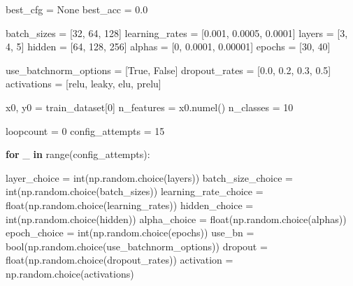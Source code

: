 \documentclass[
  letterpaper,
  DIV=11,
  numbers=noendperiod]{scrartcl}
\newenvironment{Shaded}{\begin{snugshade}}{\end{snugshade}}
\newcommand{\BuiltInTok}[1]{\textcolor[rgb]{0.00,0.23,0.31}{#1}}
\newcommand{\ControlFlowTok}[1]{\textcolor[rgb]{0.00,0.23,0.31}{\textbf{#1}}}
\newcommand{\DecValTok}[1]{\textcolor[rgb]{0.68,0.00,0.00}{#1}}
\newcommand{\FloatTok}[1]{\textcolor[rgb]{0.68,0.00,0.00}{#1}}
\newcommand{\KeywordTok}[1]{\textcolor[rgb]{0.00,0.23,0.31}{\textbf{#1}}}
\newcommand{\NormalTok}[1]{\textcolor[rgb]{0.00,0.23,0.31}{#1}}
\newcommand{\OperatorTok}[1]{\textcolor[rgb]{0.37,0.37,0.37}{#1}}
\newcommand{\StringTok}[1]{\textcolor[rgb]{0.13,0.47,0.30}{#1}}
\newcommand{\VariableTok}[1]{\textcolor[rgb]{0.07,0.07,0.07}{#1}}
\begin{document}
\begin{Shaded}
\begin{Highlighting}[]
\NormalTok{    best\_cfg }\OperatorTok{=} \VariableTok{None}
\NormalTok{    best\_acc }\OperatorTok{=} \FloatTok{0.0}

\NormalTok{    batch\_sizes }\OperatorTok{=}\NormalTok{ [}\DecValTok{32}\NormalTok{, }\DecValTok{64}\NormalTok{, }\DecValTok{128}\NormalTok{]}
\NormalTok{    learning\_rates }\OperatorTok{=}\NormalTok{ [}\FloatTok{0.001}\NormalTok{, }\FloatTok{0.0005}\NormalTok{, }\FloatTok{0.0001}\NormalTok{]}
\NormalTok{    layers }\OperatorTok{=}\NormalTok{ [}\DecValTok{3}\NormalTok{, }\DecValTok{4}\NormalTok{, }\DecValTok{5}\NormalTok{]}
\NormalTok{    hidden }\OperatorTok{=}\NormalTok{ [}\DecValTok{64}\NormalTok{, }\DecValTok{128}\NormalTok{, }\DecValTok{256}\NormalTok{]}
\NormalTok{    alphas }\OperatorTok{=}\NormalTok{ [}\DecValTok{0}\NormalTok{, }\FloatTok{0.0001}\NormalTok{, }\FloatTok{0.00001}\NormalTok{]}
\NormalTok{    epochs }\OperatorTok{=}\NormalTok{ [}\DecValTok{30}\NormalTok{, }\DecValTok{40}\NormalTok{]}

\NormalTok{    use\_batchnorm\_options }\OperatorTok{=}\NormalTok{ [}\VariableTok{True}\NormalTok{, }\VariableTok{False}\NormalTok{]}
\NormalTok{    dropout\_rates }\OperatorTok{=}\NormalTok{ [}\FloatTok{0.0}\NormalTok{, }\FloatTok{0.2}\NormalTok{, }\FloatTok{0.3}\NormalTok{, }\FloatTok{0.5}\NormalTok{]}
\NormalTok{    activations }\OperatorTok{=}\NormalTok{ [}\StringTok{\textquotesingle{}relu\textquotesingle{}}\NormalTok{, }\StringTok{\textquotesingle{}leaky\textquotesingle{}}\NormalTok{, }\StringTok{\textquotesingle{}elu\textquotesingle{}}\NormalTok{, }\StringTok{\textquotesingle{}prelu\textquotesingle{}}\NormalTok{]}

\NormalTok{    x0, y0 }\OperatorTok{=}\NormalTok{ train\_dataset[}\DecValTok{0}\NormalTok{]}
\NormalTok{    n\_features }\OperatorTok{=}\NormalTok{ x0.numel()}
\NormalTok{    n\_classes }\OperatorTok{=} \DecValTok{10}

\NormalTok{    loopcount }\OperatorTok{=} \DecValTok{0}
\NormalTok{    config\_attempts }\OperatorTok{=} \DecValTok{15}

    \ControlFlowTok{for}\NormalTok{ \_ }\KeywordTok{in} \BuiltInTok{range}\NormalTok{(config\_attempts):}

\NormalTok{        layer\_choice }\OperatorTok{=} \BuiltInTok{int}\NormalTok{(np.random.choice(layers))}
\NormalTok{        batch\_size\_choice }\OperatorTok{=} \BuiltInTok{int}\NormalTok{(np.random.choice(batch\_sizes))}
\NormalTok{        learning\_rate\_choice }\OperatorTok{=} \BuiltInTok{float}\NormalTok{(np.random.choice(learning\_rates))}
\NormalTok{        hidden\_choice }\OperatorTok{=} \BuiltInTok{int}\NormalTok{(np.random.choice(hidden))}
\NormalTok{        alpha\_choice }\OperatorTok{=} \BuiltInTok{float}\NormalTok{(np.random.choice(alphas))}
\NormalTok{        epoch\_choice }\OperatorTok{=} \BuiltInTok{int}\NormalTok{(np.random.choice(epochs))}
\NormalTok{        use\_bn }\OperatorTok{=} \BuiltInTok{bool}\NormalTok{(np.random.choice(use\_batchnorm\_options))}
\NormalTok{        dropout }\OperatorTok{=} \BuiltInTok{float}\NormalTok{(np.random.choice(dropout\_rates))}
\NormalTok{        activation }\OperatorTok{=}\NormalTok{ np.random.choice(activations)}


\end{Highlighting}
\end{Shaded}
\end{document}
